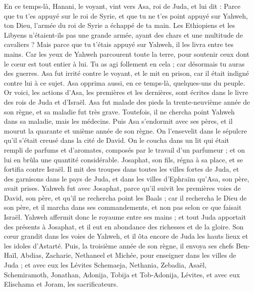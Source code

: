 \begin{multicols}{2}
En ce temps-là, Hanani, le voyant, vint vers Asa, roi de Juda, et lui dit : Parce que tu t'es appuyé sur le roi de Syrie, et que tu ne t'es point appuyé sur Yahweh, ton Dieu, l'armée du roi de Syrie a échappé de ta main.
Les Ethiopiens et les Libyens n'étaient-ils pas une grande armée, ayant des chars et une multitude de cavaliers ? Mais parce que tu t'étais appuyé sur Yahweh, il les livra entre tes mains.
Car les yeux de Yahweh parcourent toute la terre, pour soutenir ceux dont le cœur est tout entier à lui. Tu as agi follement en cela ; car désormais tu auras des guerres.
Asa fut irrité contre le voyant, et le mit en prison, car il était indigné contre lui à ce sujet. Asa opprima aussi, en ce temps-là, quelques-uns du peuple.
Or voici, les actions d'Asa, les premières et les dernières, sont écrites dans le livre des rois de Juda et d'Israël.
Asa fut malade des pieds la trente-neuvième année de son règne, et sa maladie fut très grave. Toutefois, il ne chercha point Yahweh dans sa maladie, mais les médecins.
Puis Asa s'endormit avec ses pères, et il mourut la quarante et unième année de son règne.
On l'ensevelit dans le sépulcre qu'il s'était creusé dans la cité de David. On le coucha dans un lit qui était rempli de parfums et d'aromates, composés par le travail d'un parfumeur ; et on lui en brûla une quantité considérable.
\VerseOne{}Josaphat, son fils, régna à sa place, et se fortifia contre Israël.
Il mit des troupes dans toutes les villes fortes de Juda, et des garnisons dans le pays de Juda, et dans les villes d'Ephraïm qu'Asa, son père, avait prises.
Yahweh fut avec Josaphat, parce qu'il suivit les premières voies de David, son père, et qu'il ne rechercha point les Baals ;
car il rechercha le Dieu de son père, et il marcha dans ses commandements, et non pas selon ce que faisait Israël.
Yahweh affermit donc le royaume entre ses mains ; et tout Juda apportait des présents à Josaphat, et il eut en abondance des richesses et de la gloire.
Son cœur grandit dans les voies de Yahweh, et il ôta encore de Juda les hauts lieux et les idoles d'Astarté.
Puis, la troisième année de son règne, il envoya ses chefs Ben-Haïl, Abdias, Zacharie, Nethaneel et Michée, pour enseigner dans les villes de Juda ;
et avec eux les Lévites Schemaeja, Nethania, Zebadia, Asaël, Schemiramoth, Jonathan, Adonija, Tobija et Tob-Adonija, Lévites, et avec eux Elischama et Joram, les sacrificateurs.

\end{multicols}
